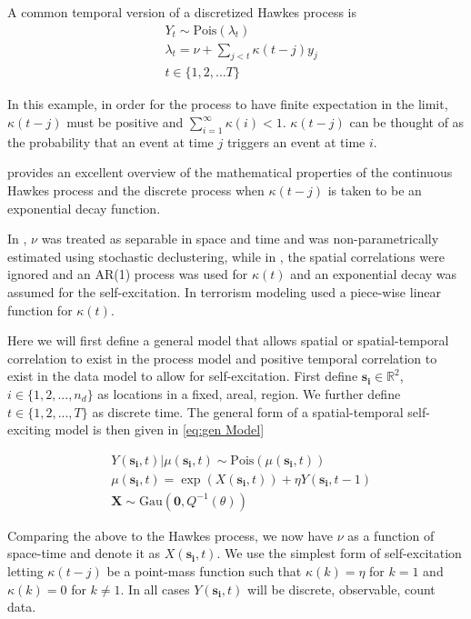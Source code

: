 \documentclass[11pt]{isuthesis}
\begin{document}
A common temporal version of a discretized Hawkes process is
\begin{align}
& Y_t\sim \mbox{Pois}(\lambda_t) \\
& \lambda_t = \nu + \sum_{j < t} \kappa (t-j) y_j \nonumber\\
& t \in \{1,2,...T\}
\end{align}

In this example, in order for the process to have finite expectation in the limit, $\kappa(t-j)$ must be positive and $\sum_{i=1}^{\infty} \kappa (i) <1$.  $\kappa (t-j)$ can be thought of as the probability that an event at time $j$ triggers an event at time $i$.

\cite{laub2015hawkes} provides an excellent overview of the mathematical properties of the continuous Hawkes process and the discrete process when $\kappa (t-j)$ is taken to be an exponential decay function.

In \cite{mohler2011self}, $\nu$ was treated as separable in space and time and was non-parametrically estimated using stochastic declustering, while in \cite{mohler2013modeling}, the spatial correlations were ignored and an AR(1) process was used for $\kappa(t)$ and an exponential decay was assumed for the self-excitation.  In terrorism modeling \cite{lewis2012self} used a piece-wise linear function for $\kappa(t)$.  

Here we will first define a general model that allows spatial or spatial-temporal correlation to exist in the process model and positive temporal correlation to exist in the data model to allow for self-excitation.  First define $\boldsymbol{s_i} \in \mathbb{R}^2$, $i \in \{1,2,...,n_d\}$ as locations in a fixed, areal, region. We further define $t \in \{1,2,...,T\}$ as discrete time. The general form of a spatial-temporal self-exciting model is then given in \eqref{eq:gen Model}

\begin{align}
& Y(\boldsymbol{s_i},t)|\mu(\boldsymbol{s_i},t) \sim \mbox{Pois}(\mu(\boldsymbol{s_i},t)) \label{eq:gen Model}\\
& \mu(\boldsymbol{s_i},t) = \exp(X(\boldsymbol{s_i},t)) + \eta Y(\boldsymbol{s_i},t-1) \nonumber \\
& \boldsymbol{X} \sim \mbox{Gau}(\boldsymbol{0},Q^{-1}(\theta)) \nonumber
\end{align}

Comparing the above to the Hawkes process, we now have $\nu$ as a function of space-time and denote it as $X(\boldsymbol{s_i},t)$.  We use the simplest form of self-excitation letting $\kappa(t-j)$ be a point-mass function such that $\kappa(k)=\eta$ for $k=1$ and $\kappa(k)=0$ for $k \neq 1$.  In all cases $Y(\boldsymbol{s_i},t)$ will be discrete, observable, count data.  
\end{document}

